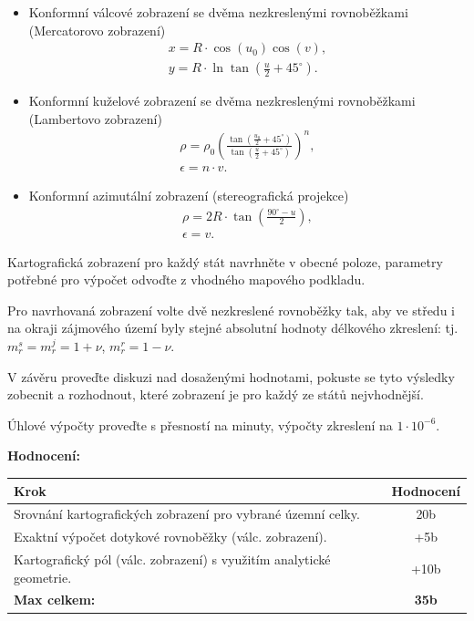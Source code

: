 \documentclass[12pt, a4paper]{article}
\begin{document}
\begin{itemize}
    \item Konformní válcové zobrazení se dvěma nezkreslenými rovnoběžkami (Mercatorovo zobrazení)
    \begin{gather*}
    x=R\cdot \cos(u_{0})\cos(v), \\
    y=R\cdot \ln \tan\left(\frac{u}{2}+45^{\circ}\right).
    \end{gather*}

    \item Konformní kuželové zobrazení se dvěma nezkreslenými rovnoběžkami (Lambertovo zobrazení)
    \begin{gather*}
    \rho=\rho_{0}\left(\frac{\tan(\frac{u_{0}}{2}+45^{\circ})}{\tan(\frac{u}{2}+45^{\circ})}\right)^{n}, \\
    \epsilon=n\cdot v.
    \end{gather*}

    \item Konformní azimutální zobrazení (stereografická projekce)
    \begin{gather*}
    \rho=2R\cdot \tan\left(\frac{90^{\circ}-u}{2}\right), \\
    \epsilon=v.
    \end{gather*}
\end{itemize}

Kartografická zobrazení pro každý stát navrhněte v obecné poloze, parametry potřebné pro výpočet odvoďte z vhodného mapového podkladu.

Pro navrhovaná zobrazení volte dvě nezkreslené rovnoběžky tak, aby ve středu i na okraji zájmového území byly stejné absolutní hodnoty délkového zkreslení: tj. $m_{r}^{s}=m_{r}^{j}=1+\nu$, $m_{r}^{r}=1-\nu$.

V závěru proveďte diskuzi nad dosaženými hodnotami, pokuste se tyto výsledky zobecnit a rozhodnout, které zobrazení je pro každý ze států nejvhodnější.

Úhlové výpočty proveďte s přesností na minuty, výpočty zkreslení na $1\cdot10^{-6}$.

\vspace{1.5em}
\textbf{Hodnocení:}
\vspace{1em}

\begin{center}
\begin{tabular}{|p{12cm}|c|}
\hline
\textbf{Krok} & \textbf{Hodnocení} \\ \hline\hline
Srovnání kartografických zobrazení pro vybrané územní celky. & 20b \\ \hline
Exaktní výpočet dotykové rovnoběžky (válc. zobrazení). & +5b \\ \hline
Kartografický pól (válc. zobrazení) s využitím analytické geometrie. & +10b \\ \hline
\textbf{Max celkem:} & \textbf{35b} \\ \hline
\end{tabular}
\end{center}
\clearpage
\newpage
\end{document}
